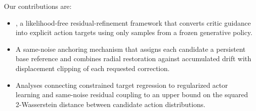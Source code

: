 Our contributions are:
\begin{itemize}
\item \method{}, a likelihood-free residual-refinement framework that converts critic guidance into explicit action targets using only samples from a frozen generative policy.
\item A same-noise anchoring mechanism that assigns each candidate a persistent base reference and combines radial restoration against accumulated drift with displacement clipping of each requested correction.
\item Analyses connecting constrained target regression to regularized actor learning and same-noise residual coupling to an upper bound on the squared 2-Wasserstein distance between candidate action distributions.
\end{itemize}

